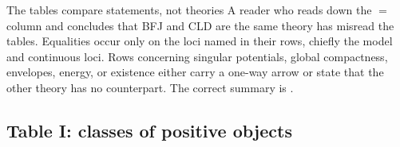 \begin{warning}{The tables compare statements, not theories}
A reader who reads down the $=$ column and concludes that BFJ and CLD are
the same theory has misread the tables.  Equalities occur only on the loci
named in their rows, chiefly the model and continuous loci.  Rows concerning
singular potentials, global compactness, envelopes, energy, or existence
either carry a one-way arrow or state that the other theory has no
counterpart.  The correct summary is .
\end{warning}

\subsection{Table I: classes of positive objects}
\label{sec:ch31-table-classes}

